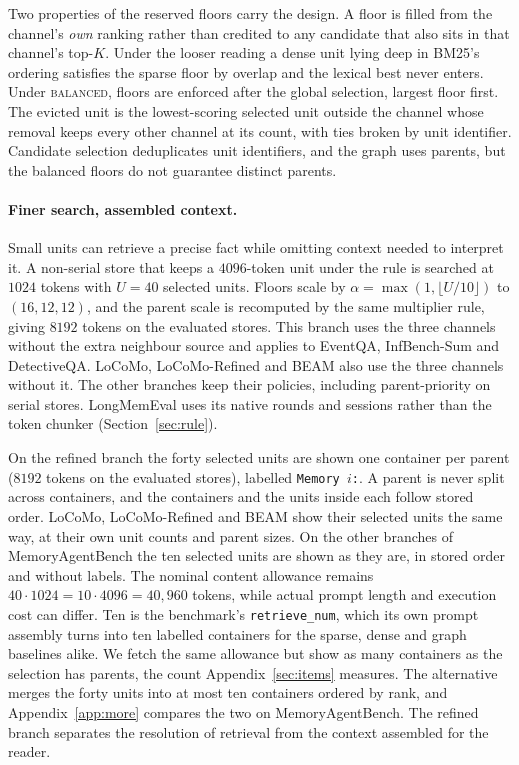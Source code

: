 \documentclass{article}
\newcommand{\balanced}{\textsc{balanced}}
\begin{document}
Two properties of the reserved floors carry the design. A floor is filled from the channel's \emph{own}
ranking rather than credited to any candidate that also sits in that channel's top-$K$. Under the looser
reading a dense unit lying deep in BM25's ordering satisfies the sparse floor by overlap and the lexical
best never enters. Under \balanced{}, floors are enforced after the global selection, largest floor first. The evicted unit is the lowest-scoring selected unit outside the channel whose removal keeps every other channel at its count, with ties broken by unit identifier. Candidate selection deduplicates unit identifiers, and the graph uses parents, but the balanced floors do not guarantee distinct parents.

\paragraph{Finer search, assembled context.}
Small units can retrieve a precise fact while omitting context needed to interpret it. A non-serial store
that keeps a $4096$-token unit under the rule is searched at $1024$ tokens with $U=40$
selected units. Floors scale by $\alpha=\max(1,\lfloor U/10\rfloor)$ to $(16,12,12)$, and the parent
scale is recomputed by the same multiplier rule, giving $8192$ tokens on the evaluated stores.
This branch uses the three channels without the extra neighbour source and applies to EventQA,
InfBench-Sum and DetectiveQA. LoCoMo, LoCoMo-Refined and BEAM also use the three channels without it. The other branches keep their policies, including parent-priority
on serial stores. LongMemEval uses its native rounds and sessions rather than the token chunker (Section~\ref{sec:rule}).

On the refined branch the forty selected units are shown one container per parent ($8192$ tokens on the
evaluated stores), labelled \texttt{Memory $i$:}. A parent is never split across containers, and the containers and
the units inside each follow stored order. LoCoMo, LoCoMo-Refined and BEAM show their selected units the same way, at their own unit counts and parent sizes. On the other branches of MemoryAgentBench the ten selected units are shown as they are, in
stored order and without labels. The nominal content allowance remains $40\cdot1024=10\cdot4096=40{,}960$ tokens,
while actual prompt length and execution cost can differ. Ten is the benchmark's \texttt{retrieve\_num}, which its
own prompt assembly turns into ten labelled containers for the sparse, dense and graph baselines alike. We fetch
the same allowance but show as many containers as the selection has parents, the count Appendix~\ref{sec:items}
measures. The alternative merges the forty units into at most ten containers ordered by rank, and Appendix~\ref{app:more} compares the two on MemoryAgentBench.
The refined branch separates the resolution of retrieval from the context assembled for the reader.
\end{document}
